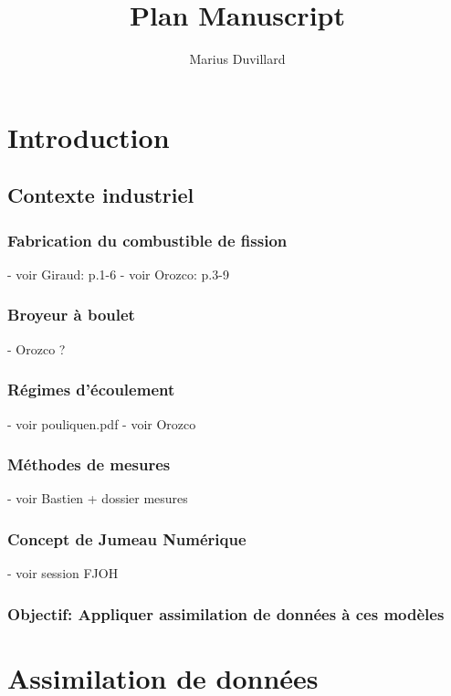 \documentclass{article}
\title{Plan Manuscript}
\author{Marius Duvillard}
\begin{document}
\maketitle
\tableofcontents
\section{Introduction}

\subsection{Contexte industriel}

\subsubsection{Fabrication du combustible de fission}
- voir Giraud: p.1-6
- voir Orozco: p.3-9

\subsubsection{Broyeur à boulet}
- Orozco ?

\subsubsection{Régimes d'écoulement}
- voir pouliquen.pdf
- voir Orozco

\subsubsection{Méthodes de mesures}
- voir Bastien + dossier mesures
\subsubsection{Concept de Jumeau Numérique}
- voir session FJOH

\subsubsection{Objectif: Appliquer assimilation de données à ces modèles}
\section{Assimilation de données}
\end{document}
